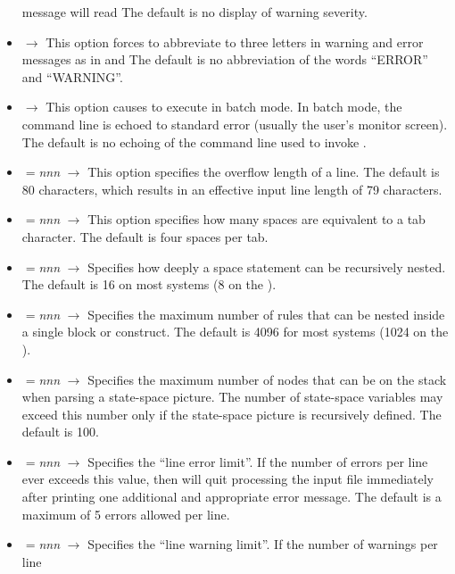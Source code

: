 \begin{footnotesize}
\begin{itemize}
      message will read 
      The default is no display of warning severity.
\item {} $\longrightarrow$
      This option forces  to abbreviate to three letters
      in warning and error messages as in \word{[ERR]} and \word{[WRN]}
      The default is no abbreviation of the words ``ERROR'' and ``WARNING''.
\item {} $\longrightarrow$
      This option causes  to execute in batch mode.   In batch
      mode, the command line is echoed to standard error (usually
      the user's monitor screen).
      The default is no echoing of the command line used to
      invoke .
\item {}$=${\em nnn} $\longrightarrow$
      This option specifies the overflow length of a line.  The default is 80
      characters, which results in an effective input line length
      of 79 characters.
\item {}$=${\em nnn} $\longrightarrow$
      This option specifies how many spaces are equivalent to a tab character.
      The default is four spaces per tab.
\item {}$=${\em nnn} $\longrightarrow$
      Specifies how deeply a space statement
      can be recursively nested.   The default is 16 on most systems
      (8 on the ).
\item {}$=${\em nnn} $\longrightarrow$
      Specifies the maximum number of rules that can be nested inside a
      single block
       or  construct.   The default is 4096 for
      most systems (1024 on the ).
\item {}$=${\em nnn} $\longrightarrow$
      Specifies the maximum number of nodes that can be on the stack when
      parsing a state-space picture.   The number of state-space variables
      may exceed this
      number only if the state-space picture is recursively defined.
      The default is 100.
\item {}$=${\em nnn} $\longrightarrow$
      Specifies the ``line error limit''.   If the number of errors per line
      ever exceeds this value, then  will quit
      processing the input file
      immediately after printing one additional and appropriate error message.
      The default is a maximum of 5 errors allowed per line.
\item {}$=${\em nnn} $\longrightarrow$
      Specifies the ``line warning limit''.   If the number of warnings per line

\end{itemize}
\end{footnotesize}

